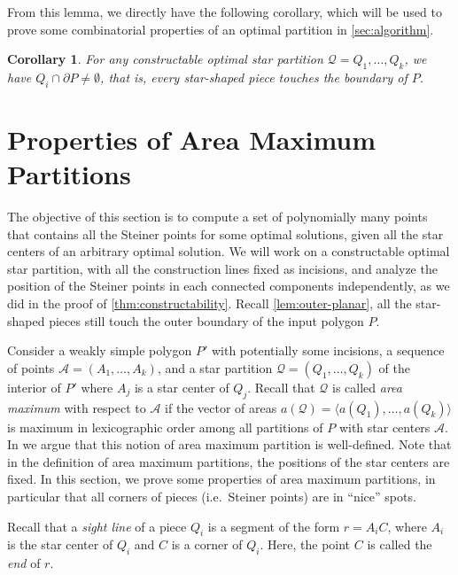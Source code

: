 \documentclass[10pt,a4paper]{article}
\newtheorem{corollary}{Corollary}[section]
\begin{document}
From this lemma, we directly have the following corollary, which will be used to prove some combinatorial properties of an optimal partition in \cref{sec:algorithm}. 

\begin{corollary}
    \label{cor:outer-planarity}
    For any constructable optimal star partition $\mathcal{Q} = Q_1, \dots, Q_k$, we have $Q_i \cap \partial P \neq \emptyset$, that is, every star-shaped piece touches the boundary of $P$. 
\end{corollary}




\section{Properties of Area Maximum Partitions}
\label{sec:area-max}

The objective of this section is to compute a set of polynomially many points that contains all the Steiner points for some optimal solutions, given all the star centers of an arbitrary optimal solution. 
We will work on a constructable optimal star partition, with all the construction lines fixed as incisions, and analyze the position of the Steiner points in each connected components independently, as we did in the proof of \cref{thm:constructability}. 
Recall \cref{lem:outer-planar}, all the star-shaped pieces still touch the outer boundary of the input polygon $P$. 

Consider a weakly simple polygon $P'$ with potentially some incisions, a sequence of points $\mathcal A=(A_1,\ldots,A_k)$, and a star partition $\mathcal Q=(Q_1,\ldots,Q_k)$ of the interior of $P'$ where $A_j$ is a star center of $Q_j$.
Recall that $\mathcal Q$ is called \emph{area maximum} with respect to $\mathcal A$ if the vector of areas $a(\mathcal Q)=\langle a(Q_1),\ldots,a(Q_k)\rangle$ is maximum in lexicographic order among all partitions of $P$ with star centers $\mathcal A$.
In  we argue that this notion of area maximum partition is well-defined.
Note that in the definition of area maximum partitions, the positions of the star centers are fixed.
In this section, we prove some properties of area maximum partitions, in particular that all corners of pieces (i.e.\ Steiner points) are in ``nice'' spots.

Recall that a \emph{sight line} of a piece $Q_i$ is a segment of the form $r=A_iC$, where $A_i$ is the star center of $Q_i$ and $C$ is a corner of $Q_i$.
Here, the point $C$ is called the \emph{end} of $r$.
\end{document}
